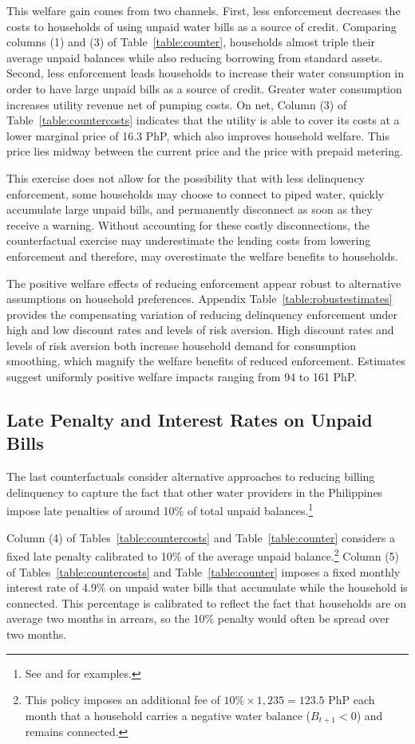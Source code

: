 \documentclass[12pt]{article}
\begin{document}
This welfare gain comes from two channels.  First, less enforcement decreases the costs to households of using unpaid water bills as a source of credit.  Comparing columns (1) and (3) of Table~\ref{table:counter}, households almost triple their average unpaid balances while also reducing borrowing from standard assets.  Second, less enforcement leads households to increase their water consumption in order to have large unpaid bills as a source of credit.  Greater water consumption increases utility revenue net of pumping costs.  On net, Column (3) of Table~\ref{table:countercosts} indicates that the utility is able to cover its costs at a lower marginal price of 16.3 PhP, which also improves household welfare.  This price lies midway between the current price and the price with prepaid metering.

This exercise does not allow for the possibility that with less delinquency enforcement, some households may choose to connect to piped water, quickly accumulate large unpaid bills, and permanently disconnect as soon as they receive a warning.  Without accounting for these costly disconnections, the counterfactual exercise may underestimate the lending costs from lowering enforcement and therefore, may overestimate the welfare benefits to households.

The positive welfare effects of reducing enforcement appear robust to alternative assumptions on household preferences.  Appendix Table~\ref{table:robustestimates} provides the compensating variation of reducing delinquency enforcement under high and low discount rates and levels of risk aversion.  High discount rates and levels of risk aversion both increase household demand for consumption smoothing, which magnify the welfare benefits of reduced enforcement.  Estimates suggest uniformly positive welfare impacts ranging from 94 to 161 PhP.

\subsection{Late Penalty and Interest Rates on Unpaid Bills}\label{section:latepenalty}

The last counterfactuals consider alternative approaches to reducing billing delinquency to capture the fact that other water providers in the Philippines impose late penalties of around 10\% of total unpaid balances.\footnote{See \cite{mnwd_guidelines_bills_payments} and \cite{ppcwater_ur_billing} for examples.}

Column (4) of Tables~\ref{table:countercosts} and Table~\ref{table:counter} considers a fixed late penalty calibrated to 10\% of the average unpaid balance.\footnote{This policy imposes an additional fee of $10\% \times 1{,}235 = 123.5$ PhP each month that a household carries a negative water balance ($B_{t+1}<0$) and remains connected.} Column (5) of Tables~\ref{table:countercosts} and Table~\ref{table:counter} imposes a fixed monthly interest rate of 4.9\% on unpaid water bills that accumulate while the household is connected.  This percentage is calibrated to reflect the fact that  households are on average two months in arrears, so the 10\% penalty would often be spread over two months.
\end{document}
